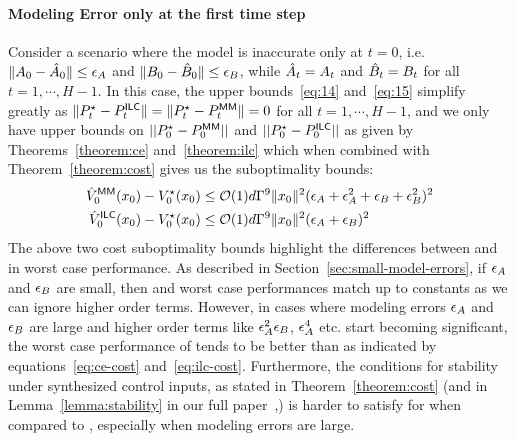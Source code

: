 \paragraph{Modeling Error only at the first time step}
\label{sec:modeling-error-only}

Consider a scenario where the model is inaccurate only at $t=0$,
i.e. $\|A_0 - \hat{A}_0\|\leq\epsilon_A$ and 
$\|B_0 - \hat{B}_0\|\leq\epsilon_B$, while $\hat{A}_t = A_t$ and $\hat{B}_t =
B_t$ for all $t=1, \cdots, H-1$. In this case, the upper
bounds~\eqref{eq:14} and~\eqref{eq:15} simplify greatly as $\|P^\star_t
- P^\mathsf{ILC}_t\| = \|P^\star_t - P^\mathsf{MM}_t\| = 0$ for all $t=1, \cdots, H-1$,
and we only have upper bounds on $||P^\star_0 - P^\mathsf{MM}_0||$ and $||P^\star_0
- P^\mathsf{ILC}_0||$ as given by Theorems~\ref{theorem:ce}
and~\ref{theorem:ilc} which when combined with
Theorem~\ref{theorem:cost} gives us the suboptimality bounds:
\begin{align}
  \hat{V}_0^{\mathsf{MM}}(x_0) - V_0^\star(x_0) &\leq
  \mathcal{O}(1)d\Gamma^9\|x_0\|^2(\epsilon_A + \epsilon_A^2 + \epsilon_B +
                                                \epsilon_B^2)^2 \label{eq:ce-cost}\\
  \hat{V}_0^{\mathsf{ILC}}(x_0) - V_0^\star(x_0) &\leq
  \mathcal{O}(1)d\Gamma^9\|x_0\|^2(\epsilon_A + \epsilon_B)^2\label{eq:ilc-cost}                                                
\end{align}
The above two cost suboptimality bounds highlight the differences
between \MM{} and \ILC{} in worst case performance. As described in
Section~\ref{sec:small-model-errors}, if $\epsilon_A$ and $\epsilon_B$ are
small, then \MM{} and \ILC{} worst case performances match up to constants as
we can ignore higher order terms.
However, in cases where modeling errors $\epsilon_A$ and $\epsilon_B$ are large
and higher order terms like $\epsilon_A^2\epsilon_B$, $\epsilon_A^4$ etc. start
becoming significant, the worst case performance of \ILC{} tends to be
better than \MM{} as indicated by equations~\eqref{eq:ce-cost}
and~\eqref{eq:ilc-cost}. Furthermore, the conditions for stability
under synthesized control inputs, as
stated in Theorem~\ref{theorem:cost} (and in
Lemma~\ref{lemma:stability} in our full paper~\cite{DBLP:journals/corr/abs-2111-09434},) is harder to satisfy for \MM{}
when compared to \ILC{}, especially when modeling errors are large.

